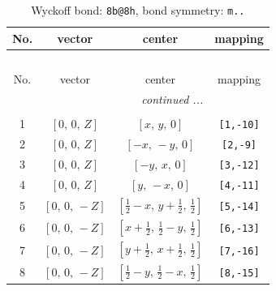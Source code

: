 \documentclass[fleqn,8pt]{jsarticle}
\begin{document}
\begin{longtable}{cccc}
\caption{Wyckoff bond: {\tt 8b@8h}, bond symmetry: {\tt m..}}
 \\
 \hline \hline
No. & vector & center & mapping \\ \hline \endfirsthead

\multicolumn{3}{l}{\tablename\ \thetable{}} \\
 \hline \hline
No. & vector & center & mapping \\ \hline \endhead

 \hline \hline
\multicolumn{3}{r}{\footnotesize\it continued ...} \\ \endfoot

 \hline \hline
\multicolumn{3}{r}{} \\ \endlastfoot

1 & $\left[ 0,\, 0,\, Z \right]$ & $\left[ x,\, y,\, 0 \right]$ & {\tt [1,-10]} \\ \hline
2 & $\left[ 0,\, 0,\, Z \right]$ & $\left[ - x,\, - y,\, 0 \right]$ & {\tt [2,-9]} \\ \hline
3 & $\left[ 0,\, 0,\, Z \right]$ & $\left[ - y,\, x,\, 0 \right]$ & {\tt [3,-12]} \\ \hline
4 & $\left[ 0,\, 0,\, Z \right]$ & $\left[ y,\, - x,\, 0 \right]$ & {\tt [4,-11]} \\ \hline
5 & $\left[ 0,\, 0,\, - Z \right]$ & $\left[ \frac{1}{2} - x,\, y + \frac{1}{2},\, \frac{1}{2} \right]$ & {\tt [5,-14]} \\ \hline
6 & $\left[ 0,\, 0,\, - Z \right]$ & $\left[ x + \frac{1}{2},\, \frac{1}{2} - y,\, \frac{1}{2} \right]$ & {\tt [6,-13]} \\ \hline
7 & $\left[ 0,\, 0,\, - Z \right]$ & $\left[ y + \frac{1}{2},\, x + \frac{1}{2},\, \frac{1}{2} \right]$ & {\tt [7,-16]} \\ \hline
8 & $\left[ 0,\, 0,\, - Z \right]$ & $\left[ \frac{1}{2} - y,\, \frac{1}{2} - x,\, \frac{1}{2} \right]$ & {\tt [8,-15]} \\
\end{longtable}
\renewcommand{\arraystretch}{1.2}
\end{document}
